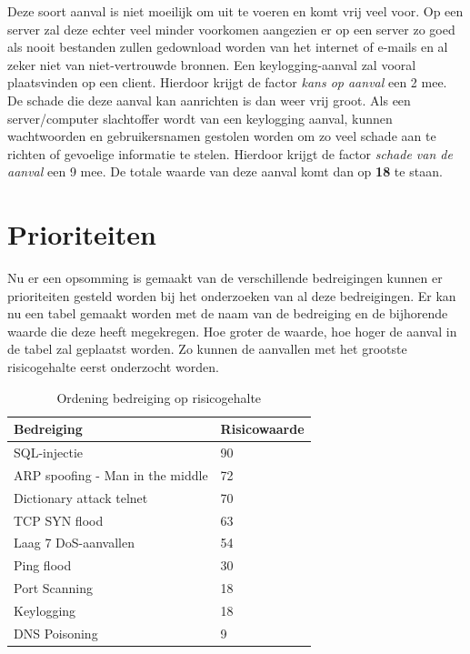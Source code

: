 \documentclass[pdftex,a4paper,12pt]{report}
\begin{document}
Deze soort aanval is niet moeilijk om uit te voeren en komt vrij veel voor. Op een server zal deze echter veel minder voorkomen aangezien er op een server zo goed als nooit bestanden zullen gedownload worden van het internet of e-mails en al zeker niet van niet-vertrouwde bronnen. Een keylogging-aanval zal vooral plaatsvinden op een client. Hierdoor krijgt de factor \textit{kans op aanval} een 2 mee. De schade die deze aanval kan aanrichten is dan weer vrij groot. Als een server/computer slachtoffer wordt van een keylogging aanval, kunnen wachtwoorden en gebruikersnamen gestolen worden om zo veel schade aan te richten of gevoelige informatie te stelen. Hierdoor krijgt de factor \textit{schade van de aanval} een 9 mee. De totale waarde van deze aanval komt dan op \textbf{18} te staan.

\section{Prioriteiten}
Nu er een opsomming is gemaakt van de verschillende bedreigingen kunnen er prioriteiten gesteld worden bij het onderzoeken van al deze bedreigingen. Er kan nu een tabel gemaakt worden met de naam van de bedreiging en de bijhorende waarde die deze heeft megekregen. Hoe groter de waarde, hoe hoger de aanval in de tabel zal geplaatst worden. Zo kunnen de aanvallen met het grootste risicogehalte eerst onderzocht worden.

\begin{table}[h]
\centering
\begin{tabular}{|l|l|}
\hline
\textbf{Bedreiging}              & \textbf{Risicowaarde} \\ \hline
SQL-injectie                     & 90                    \\ \hline
ARP spoofing - Man in the middle & 72                    \\ \hline
Dictionary attack telnet         & 70                    \\ \hline
TCP SYN flood                    & 63                    \\ \hline
Laag 7 DoS-aanvallen             & 54                    \\ \hline
Ping flood                       & 30                    \\ \hline
Port Scanning                    & 18                    \\ \hline
Keylogging                       & 18                    \\ \hline
DNS Poisoning                    & 9                     \\ \hline
\end{tabular}
\caption{Ordening bedreiging op risicogehalte}
\label{RisicoTabel}
\end{table}
\end{document}

